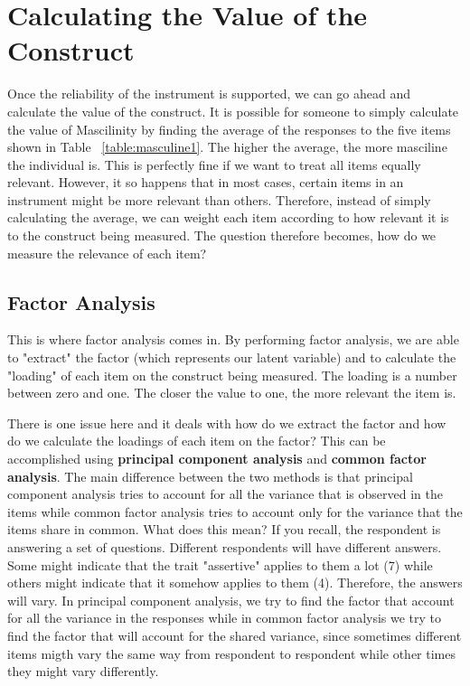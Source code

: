 \documentclass[a4paper,12pt,oneside]{book}
\begin{document}
\section{Calculating the Value of the Construct}
Once the reliability of the instrument is supported, we can go ahead and calculate the value of the construct. It is possible for someone to 
simply calculate the value of Mascilinity by finding the average of the responses to the five items shown in Table ~\ref{table:masculine1}. 
The higher the average, the more masciline the individual is. This is perfectly fine if we want to treat all items equally relevant. However,
it so happens that in most cases, certain items in an instrument might be more relevant than others. Therefore, instead of simply calculating the 
average, we can weight each item according to how relevant it is to the construct being measured. The question therefore becomes, how do we measure
the relevance of each item?

\subsection{Factor Analysis}
This is where factor analysis comes in. By performing factor analysis, we are able to "extract" the factor (which represents our latent variable)
and to calculate the "loading" of each item on the construct being measured. The loading is a number between zero and one. The closer the value to 
one, the more relevant the item is. 

There is one issue here and it deals with how do we extract the factor and how do we calculate the loadings of each item on the factor? This can
be accomplished using \textbf{principal component analysis} and \textbf{common factor analysis}. The main difference between the two methods is that 
principal component analysis tries to account for all the variance that is
observed in the items while common factor analysis tries to account only for the variance that the items share in common. What does this mean? If you
recall, the respondent is answering a set of questions. Different respondents will have different answers. Some might indicate that the trait 
"assertive" applies to them a lot (7) while others might indicate that it somehow applies to them (4). Therefore, the answers will vary. In principal
component analysis, we try to find the factor that account for all the variance in the responses while in common factor analysis we try to find
the factor that will account for the shared variance, since sometimes different items migth vary the same way from respondent to respondent while
other times they might vary differently.
\end{document}
